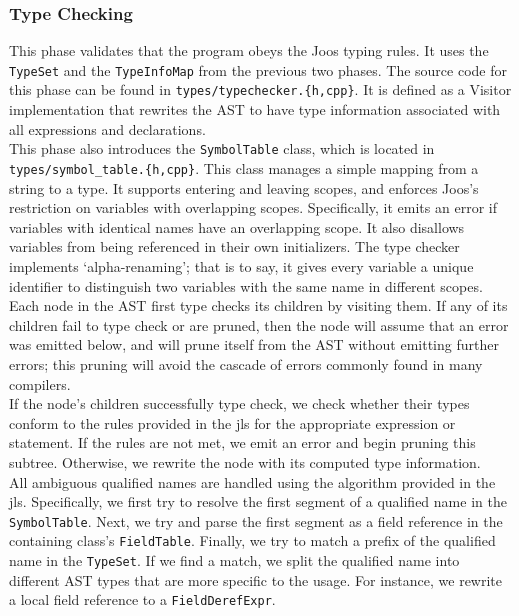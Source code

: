 \documentclass[12pt, titlepage]{article}
\newcommand{\z}[1]{\texttt{#1}}
\begin{document}
\subsubsection{Type Checking}\label{subsubsec:type-checking}

This phase validates that the program obeys the Joos typing rules. It uses the
\z{TypeSet} and the \z{TypeInfoMap} from the previous two phases. The source code
for this phase can be found in \z{types/typechecker.\{h,cpp\}}. It is defined as a
Visitor implementation that rewrites the AST to have type information
associated with all expressions and declarations.\\

This phase also introduces the \z{SymbolTable} class, which is located in
\z{types/symbol\_table.\{h,cpp\}}. This class manages a simple mapping from a string
to a type. It supports entering and leaving scopes, and enforces Joos's
restriction on variables with overlapping scopes. Specifically, it emits an error if
variables with identical names have an overlapping scope. It also disallows
variables from being referenced in their own initializers. The type checker
implements `alpha-renaming'; that is to say, it gives every variable a unique
identifier to distinguish two variables with the same name in different scopes.\\

Each node in the AST first type checks its children by visiting them. If any of
its children fail to type check or are pruned, then the node will assume that
an error was emitted below, and will prune itself from the AST without emitting
further errors; this pruning will avoid the cascade of errors commonly found in
many compilers.\\
If the node's children successfully type check, we check whether their types
conform to the rules provided in the \ac{jls} for the appropriate expression or
statement. If the rules are not met, we emit an error and begin pruning this
subtree. Otherwise, we rewrite the node with its computed type
information. \\

All ambiguous qualified names are handled using the algorithm provided in the
\ac{jls}. Specifically, we first try to resolve the first segment of a
qualified name in the \z{SymbolTable}. Next, we try and parse the first segment
as a field reference in the containing class's \z{FieldTable}. Finally, we try to
match a prefix of the qualified name in the \z{TypeSet}. If we find a match, we
split the qualified name into different AST types that are more specific to the
usage. For instance, we rewrite a local field reference to a \z{FieldDerefExpr}.
\end{document}
